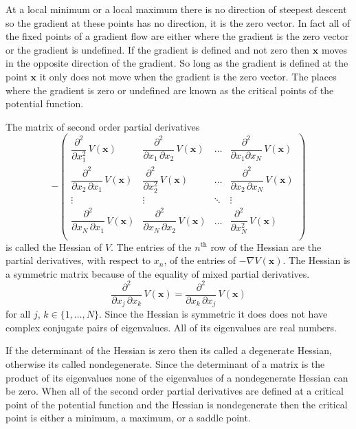    At a local minimum or a local maximum there is no direction of steepest
descent so the gradient at these points has no direction, it is the zero 
vector.  In fact all of the fixed points of a gradient flow are either where 
the gradient is the zero vector or the gradient is undefined.  If the gradient 
is defined and not zero then $\mathbf{x}$ moves in the opposite direction of 
the gradient.  So long as the gradient is defined at the point $\mathbf{x}$ it
only does not move when the gradient is the zero vector.  The places where the 
gradient is zero or undefined are known as the critical points of the potential 
function.

   The matrix of second order partial derivatives
\begin{equation*}
-
\begin{pmatrix}
\dfrac{\partial^2}{\partial x_1^2}\, V(\mathbf{x}) &
\dfrac{\partial^2}{\partial x_1 \, \partial x_2}\, V(\mathbf{x}) &
\ldots & \dfrac{\partial^2}{\partial x_1 \partial x_N}\, V(\mathbf{x})  \\[4mm]
\dfrac{\partial^2}{\partial x_2 \, \partial x_1}\, V(\mathbf{x}) &
\dfrac{\partial^2}{\partial x_2^2}\, V(\mathbf{x}) &
\ldots & \dfrac{\partial^2}{\partial x_2\,  \partial x_N}\, V(\mathbf{x})  
\\[4mm]
   \vdots & \vdots & \ddots & \vdots \\[4mm]
\dfrac{\partial^2}{\partial x_N \, \partial x_1}\, V(\mathbf{x}) &
\dfrac{\partial^2}{\partial x_N \, \partial x_2}\, V(\mathbf{x}) &
\ldots & \dfrac{\partial^2}{\partial x_N^2}\, V(\mathbf{x})  \\[4mm]
\end{pmatrix}
\end{equation*}
is called the Hessian of $V$.  The entries of the $n^{\mathrm{th}}$ row of the
Hessian are the partial derivatives, with respect to $x_n$, of the entries of 
$-\nabla V(\mathbf{x})$.  The Hessian is a symmetric matrix because of the 
equality of mixed partial derivatives.
\begin{equation*}
\dfrac{\partial^2}{\partial x_j \, \partial x_k}\, V(\mathbf{x}) 
=
\dfrac{\partial^2}{\partial x_k \, \partial x_j}\, V(\mathbf{x}) 
\end{equation*}
for all $j$, $k \in \{1, \ldots, N\}$.  Since the Hessian is symmetric it does 
does not have complex conjugate pairs of eigenvalues.  All of its eigenvalues 
are real numbers. 

   If the determinant of the Hessian is zero then its called a degenerate
Hessian, otherwise its called nondegenerate.  Since the determinant of a
matrix is the product of its eigenvalues none of the eigenvalues of a 
nondegenerate Hessian can be zero.  When all of the second order partial 
derivatives are defined at a critical point of the potential function and the 
Hessian is nondegenerate then the critical point is either a minimum, a 
maximum, or a saddle point.  


